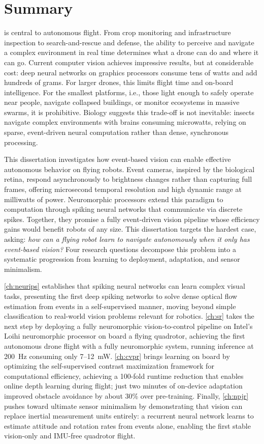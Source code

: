\chapter*{Summary}

 is central to autonomous flight. From crop monitoring and infrastructure inspection to search-and-rescue and defense, the ability to perceive and navigate a complex environment in real time determines what a drone can do and where it can go. Current computer vision achieves impressive results, but at considerable cost: deep neural networks on graphics processors consume tens of watts and add hundreds of grams. For larger drones, this limits flight time and on-board intelligence. For the smallest platforms, i.e., those light enough to safely operate near people, navigate collapsed buildings, or monitor ecosystems in massive swarms, it is prohibitive. Biology suggests this trade-off is not inevitable: insects navigate complex environments with brains consuming microwatts, relying on sparse, event-driven neural computation rather than dense, synchronous processing.

This dissertation investigates how event-based vision can enable effective autonomous behavior on flying robots. Event cameras, inspired by the biological retina, respond asynchronously to brightness changes rather than capturing full frames, offering microsecond temporal resolution and high dynamic range at milliwatts of power. Neuromorphic processors extend this paradigm to computation through spiking neural networks that communicate via discrete spikes. Together, they promise a fully event-driven vision pipeline whose efficiency gains would benefit robots of any size. This dissertation targets the hardest case, asking: \emph{how can a flying robot learn to navigate autonomously when it only has event-based vision?} Four research questions decompose this problem into a systematic progression from learning to deployment, adaptation, and sensor minimalism.

\cref{ch:neurips} establishes that spiking neural networks can learn complex visual tasks, presenting the first deep spiking networks to solve dense optical flow estimation from events in a self-supervised manner, moving beyond simple classification to real-world vision problems relevant for robotics. \cref{ch:sr} takes the next step by deploying a fully neuromorphic vision-to-control pipeline on Intel's Loihi neuromorphic processor on board a flying quadrotor, achieving the first autonomous drone flight with a fully neuromorphic system, running inference at 200~Hz consuming only 7--12~mW. \cref{ch:cvpr} brings learning on board by optimizing the self-supervised contrast maximization framework for computational efficiency, achieving a 100-fold runtime reduction that enables online depth learning during flight; just two minutes of on-device adaptation improved obstacle avoidance by about 30\% over pre-training. Finally, \cref{ch:npjr} pushes toward ultimate sensor minimalism by demonstrating that vision can replace inertial measurement units entirely: a recurrent neural network learns to estimate attitude and rotation rates from events alone, enabling the first stable vision-only and IMU-free quadrotor flight.

